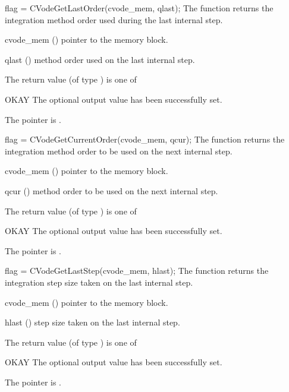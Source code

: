 {
  flag = CVodeGetLastOrder(cvode\_mem, qlast);
}
{
  The function  returns the
  integration method order used during the last internal step.
}
{
  \begin{args}
  \item[cvode\_mem] ()
    pointer to the {\cvode} memory block.
  \item[qlast] ()
    method order used on the last internal step.
  \end{args}
}
{
  The return value  (of type ) is one of
  \begin{args}
  \item[OKAY] 
    The optional output value has been successfully set.
  \item[\Id{CVG\_NO\_MEM}]
    The  pointer is .
  \end{args}
}
{}
{
  flag = CVodeGetCurrentOrder(cvode\_mem, qcur);
}
{
  The function  returns the
  integration method order to be used on the next internal step.
}
{
  \begin{args}
  \item[cvode\_mem] ()
    pointer to the {\cvode} memory block.
  \item[qcur] ()
    method order to be used on the next internal step.
  \end{args}
}
{
  The return value  (of type ) is one of
  \begin{args}
  \item[OKAY] 
    The optional output value has been successfully set.
  \item[\Id{CVG\_NO\_MEM}]
    The  pointer is .
  \end{args}
}
{}
{
  flag = CVodeGetLastStep(cvode\_mem, hlast);
}
{
  The function  returns the
  integration step size taken on the last internal step.
}
{
  \begin{args}
  \item[cvode\_mem] ()
    pointer to the {\cvode} memory block.
  \item[hlast] ()
    step size taken on the last internal step.
  \end{args}
}
{
  The return value  (of type ) is one of
  \begin{args}
  \item[OKAY] 
    The optional output value has been successfully set.
  \item[\Id{CVG\_NO\_MEM}]
    The  pointer is .
  \end{args}
}
